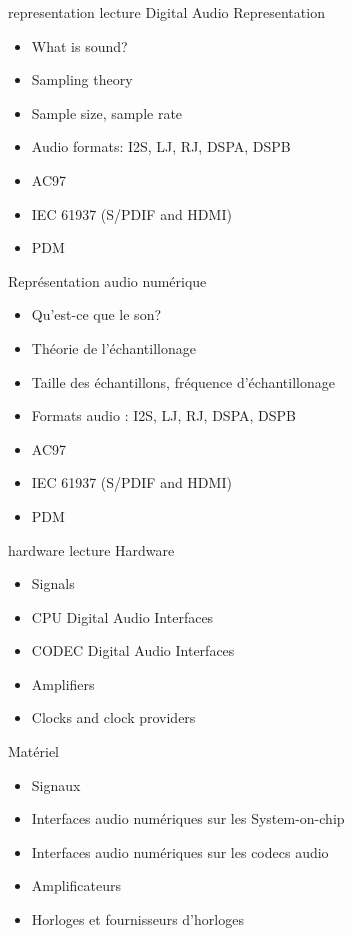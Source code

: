 \def \haslabs{false}

\def \onsitelecturetimeratio{75}
\def \onsitedemotimeratio{25}


{representation}
{lecture}
{Digital Audio Representation}
{
  \begin{itemize}
  \item What is sound?
  \item Sampling theory
  \item Sample size, sample rate
  \item Audio formats: I2S, LJ, RJ, DSPA, DSPB
  \item AC97
  \item IEC 61937 (S/PDIF and HDMI)
  \item PDM
  \end{itemize}
  \vspace{0.5em}
}
{Représentation audio numérique}
{
  \begin{itemize}
  \item Qu'est-ce que le son?
  \item Théorie de l'échantillonage
  \item Taille des échantillons, fréquence d'échantillonage
  \item Formats audio : I2S, LJ, RJ, DSPA, DSPB
  \item AC97
  \item IEC 61937 (S/PDIF and HDMI)
  \item PDM
  \end{itemize}
  \vspace{0.5em}
}
{hardware}
{lecture}
{Hardware}
{
  \begin{itemize}
  \item Signals
  \item CPU Digital Audio Interfaces
  \item CODEC Digital Audio Interfaces
  \item Amplifiers
  \item Clocks and clock providers
  \end{itemize}
  \vspace{0.5em}
}
{Matériel}
{
  \begin{itemize}
  \item Signaux
  \item Interfaces audio numériques sur les System-on-chip
  \item Interfaces audio numériques sur les codecs audio
  \item Amplificateurs
  \item Horloges et fournisseurs d'horloges
  \end{itemize}
  \vspace{0.5em}
}
